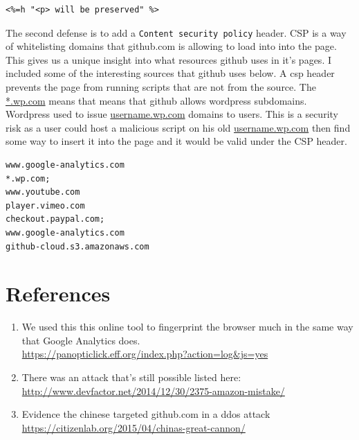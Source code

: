 \documentclass[12pt]{article}
\renewcommand{\tt}[1]{\texttt{#1}}
\begin{document}
\begin{lstlisting}
<%=h "<p> will be preserved" %>
\end{lstlisting}

The second defense is to add a \tt{Content security policy} header. CSP is a way of whitelisting domains that github.com is allowing to load into into the page. This gives us a unique insight into what resources github uses in it's pages. I included some of the interesting sources that github uses below. A csp header prevents the page from running scripts that are not from the source. The \url{*.wp.com} means that means that github allows wordpress subdomains. Wordpress used to issue \url{username.wp.com} domains to users. This is a security risk as a user could host a malicious script on his old \url{username.wp.com} then find some way to insert it into the page and it would be valid under the CSP header.

\begin{lstlisting}
www.google-analytics.com
*.wp.com;
www.youtube.com 
player.vimeo.com 
checkout.paypal.com;  
www.google-analytics.com 
github-cloud.s3.amazonaws.com
\end{lstlisting}

\section{References}\label{references}
\begin{enumerate}
\item We used this this online tool to fingerprint the browser much in the same way that Google Analytics does.\\ \url{https://panopticlick.eff.org/index.php?action=log&js=yes}

\item There was an attack that's still possible listed here: \url{http://www.devfactor.net/2014/12/30/2375-amazon-mistake/}
\item Evidence the chinese targeted github.com in a ddos attack \url{https://citizenlab.org/2015/04/chinas-great-cannon/}
\end{enumerate}
\end{document}
